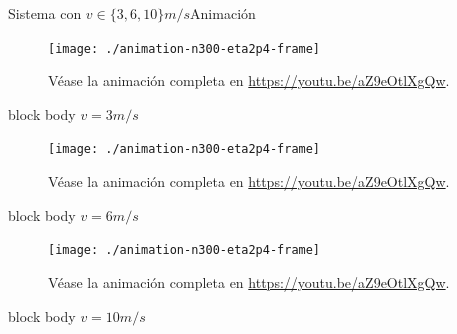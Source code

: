 \documentclass{beamer}
\begin{document}
            \begin{frame}{Sistema con $v \in \{ 3, 6, 10\}m/s$}{Animación}
                \begin{minipage}[t]{0.3\textwidth}
                    \begin{figure}[H!]
                        \texttt{[image: ./animation-n300-eta2p4-frame]}
                        \caption*{Véase la animación completa en \url{https://youtu.be/aZ9eOtlXgQw}.}
                        \label{fig:a_3}
                    \end{figure}
                    \begin{beamercolorbox}[sep=5pt,center]{block body}
                        \centering
                        \small{$v=3m/s$}
                    \end{beamercolorbox}
                \end{minipage}
                \hfill
                \begin{minipage}[t]{0.30\textwidth}
                    \begin{figure}[H!]
                        \texttt{[image: ./animation-n300-eta2p4-frame]}
                        \caption*{Véase la animación completa en \url{https://youtu.be/aZ9eOtlXgQw}.}
                        \label{fig:a_6}
                    \end{figure}
                    \begin{beamercolorbox}[sep=5pt,center]{block body}
                        \centering
                        \small{$v=6m/s$}
                    \end{beamercolorbox}
                \end{minipage}
                \hfill
                \begin{minipage}[t]{0.30\textwidth}
                    \begin{figure}[H!]
                        \texttt{[image: ./animation-n300-eta2p4-frame]}
                        \caption*{Véase la animación completa en \url{https://youtu.be/aZ9eOtlXgQw}.}
                        \label{fig:a_10}
                    \end{figure}
                    \begin{beamercolorbox}[sep=5pt,center]{block body}
                        \centering
                        \small{$v=10m/s$}
                    \end{beamercolorbox}
                \end{minipage}
            \end{frame}
\end{document}
